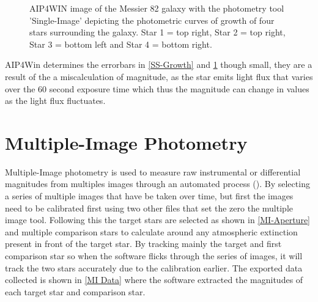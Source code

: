 \documentclass[12pt]{article}
\begin{document}
\begin{figure}[H]
\begin{multicols}{2}
\end{multicols}
\caption{AIP4WIN image of the Messier 82 galaxy with the photometry tool 'Single-Image' depicting the photometric curves of growth of four stars surrounding the galaxy. Star 1 = top right, Star 2 = top right, Star 3 = bottom left and Star 4 = bottom right.}
\label{SI-Growth}
\end{figure}

AIP4Win determines the errorbars in \cref{SS-Growth} and \cref{SI-Growth} though small, they are a result of the a miscalculation of magnitude, as the star emits light flux that varies over the 60 second exposure time which thus the magnitude can change in values as the light flux fluctuates. \\

\section{Multiple-Image Photometry}
\label{Section 3}

Multiple-Image photometry is used to measure raw instrumental or differential magnitudes from multiples images through an automated process (\cite{ImageProcessingTutorial}). By selecting a series of multiple images that have be taken over time, but first the images need to be calibrated first using two other files that set the zero the multiple image tool. Following this the target stars are selected  as shown in \cref{MI-Aperture} and multiple comparison stars to calculate around any atmospheric extinction present in front of the target star. By tracking mainly the target and first comparison star so when the software flicks through the series of images, it will track the two stars accurately due to the calibration earlier. The exported data collected is shown in \cref{MI Data} where the software extracted the magnitudes of each target star and comparison star. \\
\end{document}
